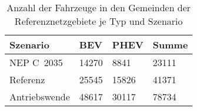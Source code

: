 {
\renewcommand{\arraystretch}{1.2}%
\begin{table}[H]
	\begin{center}
		\caption{Anzahl der Fahrzeuge in den Gemeinden der Referenznetzgebiete je Typ und Szenario}
		\begin{tabu} to 0.6\textwidth {X[1.2] X[1, r] X[1, r] X[1, r]}
			\toprule
			Szenario         & BEV         & PHEV        & Summe       \\ \midrule
			NEP C~\num{2035} & \num{14270} & \num{8841}  & \num{23111} \\
			Referenz         & \num{25545} & \num{15826} & \num{41371} \\
			Antriebswende    & \num{48617} & \num{30117} & \num{78734} \\ \bottomrule
		\end{tabu}
		\label{tab:car_count}
	\end{center}
	\vspace{-3mm}%
\end{table}
}